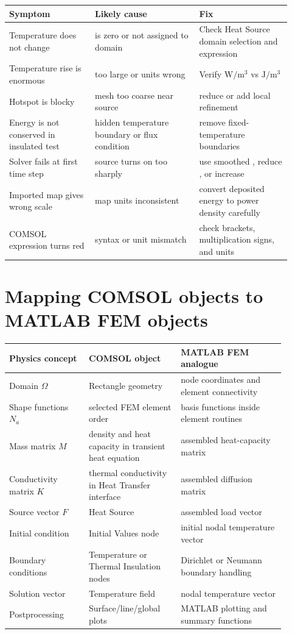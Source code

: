 \documentclass[11pt]{article}
\newcommand{\type}[1]{\texttt{\detokenize{#1}}}
\begin{document}
\begin{longtable}{p{0.28\linewidth}p{0.34\linewidth}p{0.30\linewidth}}
\toprule
\textbf{Symptom} & \textbf{Likely cause} & \textbf{Fix}\\
\midrule
Temperature does not change & \type{Qtot} is zero or not assigned to domain & Check Heat Source domain selection and expression\\
Temperature rise is enormous & \type{Q0} too large or units wrong & Verify \(\mathrm{W/m^3}\) vs \(\mathrm{J/m^3}\)\\
Hotspot is blocky & mesh too coarse near source & reduce \type{hmax} or add local refinement\\
Energy is not conserved in insulated test & hidden temperature boundary or flux condition & remove fixed-temperature boundaries\\
Solver fails at first time step & source turns on too sharply & use smoothed \type{gtime}, reduce \type{Q0}, or increase \type{tpulse}\\
Imported map gives wrong scale & map units inconsistent & convert deposited energy to power density carefully\\
COMSOL expression turns red & syntax or unit mismatch & check brackets, multiplication signs, and units\\
\bottomrule
\end{longtable}

\section{Mapping COMSOL objects to MATLAB FEM objects}

\begin{longtable}{p{0.26\linewidth}p{0.30\linewidth}p{0.34\linewidth}}
\toprule
\textbf{Physics concept} & \textbf{COMSOL object} & \textbf{MATLAB FEM analogue}\\
\midrule
Domain \(\Omega\) & Rectangle geometry & node coordinates and element connectivity\\
Shape functions \(N_a\) & selected FEM element order & basis functions inside element routines\\
Mass matrix \(M\) & density and heat capacity in transient heat equation & assembled heat-capacity matrix\\
Conductivity matrix \(K\) & thermal conductivity in Heat Transfer interface & assembled diffusion matrix\\
Source vector \(F\) & Heat Source \type{Qtot} & assembled load vector\\
Initial condition & Initial Values node & initial nodal temperature vector\\
Boundary conditions & Temperature or Thermal Insulation nodes & Dirichlet or Neumann boundary handling\\
Solution vector & Temperature field \type{T} & nodal temperature vector\\
Postprocessing & Surface/line/global plots & MATLAB plotting and summary functions\\
\bottomrule
\end{longtable}
\end{document}

